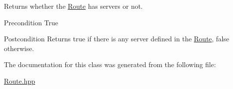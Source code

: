Returns whether the \hyperlink{class_route}{Route} has servers or not. 

\begin{DoxyPrecond}{Precondition}
True 
\end{DoxyPrecond}
\begin{DoxyPostcond}{Postcondition}
Returns true if there is any server defined in the \hyperlink{class_route}{Route}, false otherwise. 
\end{DoxyPostcond}


The documentation for this class was generated from the following file\-:\begin{DoxyCompactItemize}
\item 
\hyperlink{_route_8hpp}{Route.\-hpp}\end{DoxyCompactItemize}
